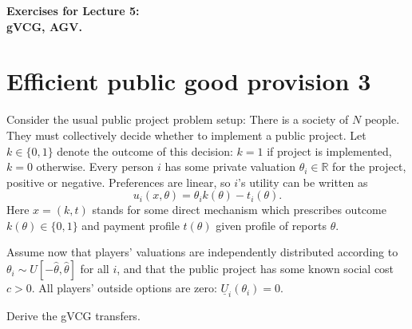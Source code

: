 \documentclass[a4paper]{article}
\newif\ifsolutions
\begin{document}
\begin{center}
		\LARGE\textbf{Exercises for Lecture 5:\\ gVCG, AGV.}
\end{center}



\section{Efficient public good provision 3}

Consider the usual public project problem setup:
There is a society of $N$ people. They must collectively decide whether to implement a public project. Let $k \in \{0,1\}$ denote the outcome of this decision: $k=1$ if project is implemented, $k=0$ otherwise. Every person $i$ has some private valuation $\theta_i \in \mathbb{R}$ for the project, positive or negative. Preferences are linear, so $i$'s utility can be written as
$$
u_i(x,\theta) = \theta_i k(\theta) - t_i(\theta).
$$
Here $x=(k,t)$ stands for some direct mechanism which prescribes outcome $k(\theta) \in \{0,1\}$ and payment profile $t(\theta)$ given profile of reports $\theta$.

Assume now that players' valuations are independently distributed according to $\theta_i \sim U[-\hat{\theta},\hat{\theta}]$ for all $i$, and that the public project has some known social cost $c > 0$. 
All players' outside options are zero: $\underline{U}_i(\theta_i)=0$.

Derive the gVCG transfers.

\ifsolutions
\section*{Solution}
LCT for any $i$ is $\tilde{\theta}_i = -\hat{\theta}$ (you do not actually need to calculate the expectation to find it, since the expression that $\tilde{\theta}_i$ minimizes is weakly monotone in $\theta_i$ -- i.e., one of the edges of the support is the solution). The gVCG transfers are then given by
\begin{align*}
	t_i^{gVCG}(\theta) &= \max \left\{0, \sum_{j\neq i}\theta_j -\hat{\theta} - c \right\} - \left(\sum_{j\neq i}\theta_j -c\right) \cdot \mathbb{I} \left\{ \sum_{j=1}^N \theta_j - c > 0 \right\}
	\\
	&= \begin{cases}
		0	&	\text{ if } \sum_{j=1}^N \theta_j - c \leq 0,
		\\
		-\left(\sum_{j\neq i}\theta_j - c \right)	&	\text{ if }	\sum_{j\neq i} \theta_j - \hat{\theta} - c \leq 0 < \sum_{j=1}^N \theta_j - c,
		\\
		-\hat{\theta}	&	\text{ if } \sum_{j\neq i}\theta_j -\hat{\theta} - c > 0.
	\end{cases}
\end{align*}
\fi
\end{document}
